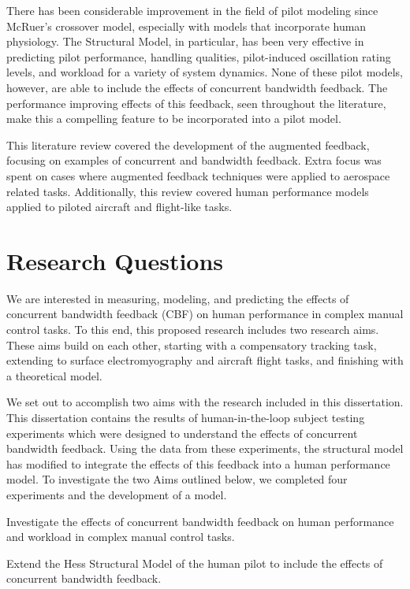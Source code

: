 There has been considerable improvement in the field of pilot modeling since McRuer's crossover model, especially with models that incorporate human physiology.
The Structural Model, in particular, has been very effective in predicting pilot performance, handling qualities, pilot-induced oscillation rating levels, and workload for a variety of system dynamics.
None of these pilot models, however, are able to include the effects of concurrent bandwidth feedback.
The performance improving effects of this feedback, seen throughout the literature, make this a compelling feature to be incorporated into a pilot model.

This literature review covered the development of the augmented feedback, focusing on examples of concurrent and bandwidth feedback.
Extra focus was spent on cases where augmented feedback techniques were applied to aerospace related tasks.
Additionally, this review covered human performance models applied to piloted aircraft and flight-like tasks.

\section{Research Questions}
\label{sec:intro_questions}
We are interested in measuring, modeling, and predicting the effects of concurrent bandwidth feedback (CBF) on human performance in complex manual control tasks.
To this end, this proposed research includes two research aims.
These aims build on each other, starting with a compensatory tracking task, extending to surface electromyography and aircraft flight tasks, and finishing with a theoretical model.

We set out to accomplish two aims with the research included in this dissertation.
This dissertation contains the results of human-in-the-loop subject testing experiments which were designed to understand the effects of concurrent bandwidth feedback.
Using the data from these experiments, the structural model has modified to integrate the effects of this feedback into a human performance model.
To investigate the two Aims outlined below, we completed four experiments and the development of a model.

\begin{description}[align=left]
    \item [Aim One] Investigate the effects of concurrent bandwidth feedback on human performance and workload in complex manual control tasks.
    \item [Aim Two] Extend the Hess Structural Model of the human pilot to include the effects of concurrent bandwidth feedback.
\end{description}


